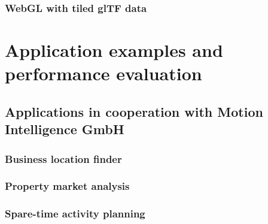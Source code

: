     \subsection{WebGL with tiled glTF data}

\cleardoublepage              %
\chapter{Application examples and performance evaluation}
  \section{Applications in cooperation with Motion Intelligence GmbH}
    \subsection{Business location finder}
    \subsection{Property market analysis}
    \subsection{Spare-time activity planning}
